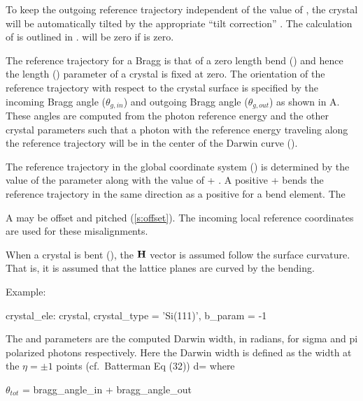 To keep the outgoing reference trajectory independent of the value of
, the crystal will be automatically tilted by the
appropriate ``tilt correction'' . The calculation of
 is outlined in . 
will be zero if  is zero.

The reference trajectory for a Bragg  is that of a zero
length bend () and hence the length ()
parameter of a crystal is fixed at zero. The orientation of the
reference trajectory with respect to the crystal surface is specified
by the incoming Bragg angle  ($\theta_{g,in}$) and
outgoing Bragg angle  ($\theta_{g,out}$) as shown
in A. These angles are computed from the photon
reference energy and the other crystal parameters such that a photon
with the reference energy traveling along the reference trajectory
will be in the center of the Darwin curve ().

The reference trajectory in the global coordinate system
() is determined by the value of the 
parameter along with the value of  +
. A positive  +
 bends the reference trajectory in the same
direction as a positive  for a bend element. The

A  may be offset and pitched (\ref{s:offset}). The incoming
local reference coordinates are used for these misalignments. 

When a crystal is bent (), the ${\bf H}$ vector is
assumed follow the surface curvature. That is, it is assumed that the
lattice planes are curved by the bending.

Example:
\begin{example}
  crystal_ele: crystal, crystal_type = 'Si(111)', b_param = -1
\end{example}

The  and  parameters are
the computed Darwin width, in radians, for sigma and pi polarized
photons respectively. Here the Darwin width is defined as the width
at the $\eta = \pm 1$ points (cf.~Batterman\cite{b:batterman} Eq (32))
\Begineq
  d\theta = 
\Endeq
where
\begin{example}
  \(\theta_{tot}\) = bragg_angle_in + bragg_angle_out 
\end{example}

